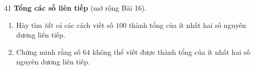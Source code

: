 
\begin{probbox}{41}{}
\textbf{Tổng các số liên tiếp} (mở rộng Bài 16).
\begin{enumerate}[label=\alph*),leftmargin=1.6em,itemsep=1pt]
\item Hãy tìm \emph{tất cả} các cách viết số $100$ thành tổng của ít nhất hai số nguyên dương liên tiếp.
\item Chứng minh rằng số $64$ không thể viết được thành tổng của ít nhất hai số nguyên dương liên tiếp.
\end{enumerate}
\end{probbox}
